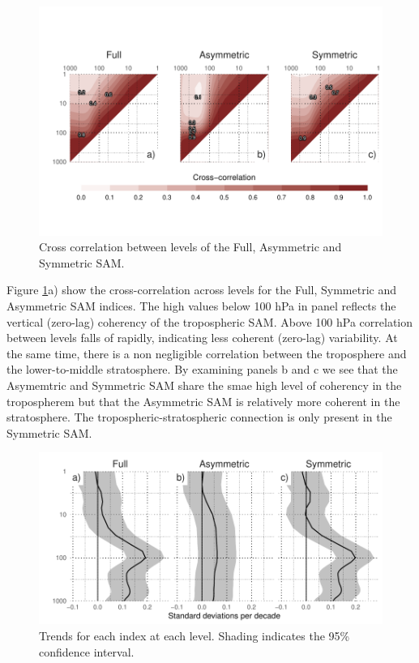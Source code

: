 \documentclass[]{ametsocV5}
\begin{document}
\begin{figure}
\includegraphics{cross-correlation-1} \caption[Cross correlation between levels of the Full, Asymmetric and Symmetric SAM]{Cross correlation between levels of the Full, Asymmetric and Symmetric SAM.}\label{fig:cross-correlation}
\end{figure}

Figure \ref{fig:cross-correlation}a) show the cross-correlation across
levels for the Full, Symmetric and Asymmetric SAM indices. The high
values below 100 hPa in panel reflects the vertical (zero-lag) coherency
of the tropospheric SAM. Above 100 hPa correlation between levels falls
of rapidly, indicating less coherent (zero-lag) variability. At the same
time, there is a non negligible correlation between the troposphere and
the lower-to-middle stratosphere. By examining panels b and c we see
that the Asymemtric and Symmetric SAM share the smae high level of
coherency in the tropospherem but that the Asymmetric SAM is relatively
more coherent in the stratosphere. The tropospheric-stratospheric
connection is only present in the Symmetric SAM.

\begin{figure}
\includegraphics{trends-1} \caption[Trends for each index at each level]{Trends for each index at each level. Shading indicates the 95\% confidence interval.}\label{fig:trends}
\end{figure}
\end{document}
